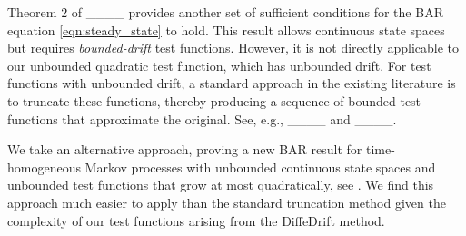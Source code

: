 Theorem 2 of ____ provides another set of sufficient conditions for the BAR equation \eqref{eqn:steady_state} to hold. This result allows continuous state spaces but requires \emph{bounded-drift} test functions. However, it is not directly applicable to our unbounded quadratic test function, which has unbounded drift. 
For test functions with unbounded drift, a standard approach in the existing literature is to truncate these functions, thereby producing a sequence of bounded test functions that approximate the original. See, e.g., ____ and ____. 

We take an alternative approach, proving a new BAR result for time-homogeneous Markov processes with unbounded continuous state spaces and unbounded test functions that grow at most quadratically, see . We find this approach much easier to apply than the standard truncation method given the complexity of our test functions arising from the DiffeDrift method.